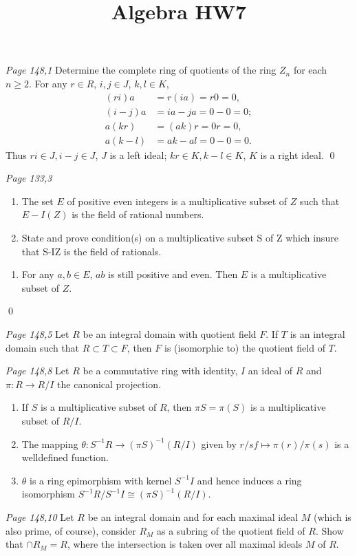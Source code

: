 

\title{Algebra HW7}
\author{\asemail}
\maketitle

\begin{enumerate}
	\isep[1em]

\prob
\textit{Page 148,1 }%
Determine the complete ring of quotients of the ring $Z_n$ for each $n\geq 2$.
\soln
For any $r \in R$, $i,j\in J$, $k,l\in K$, 
\begin{align*}
	(ri)a & =r(ia) =r0=0, \\
	(i-j)a & =ia-ja=0-0=0; \\
	a(kr) & =(ak)r =0r=0, \\
	a(k-l) & =ak-al=0-0=0. 
\end{align*}
Thus $ri \in J, i-j \in J$, $J$ is a left ideal; $kr \in K, k-l \in K$, $K$ is a right ideal.
\qed

\prob
\textit{Page 133,3}
\begin{enumerate}
	\item The set $E$ of positive even integers is a multiplicative subset of $Z$ such that $E-I(Z)$ is the field of rational numbers.
	\item State and prove condition(s) on a multiplicative subset S of Z which insure
that S-IZ is the field of rationals.
\end{enumerate}
\soln
\begin{enumerate}
	\item For any $a,b\in E$, $ab$ is still positive and even. Then $E$ is a multiplicative subset of $Z$.
\end{enumerate}
\qed

\prob
\textit{Page 148,5}
Let $R$ be an integral domain with quotient field $F$. 
If $T$ is an integral domain such that $R\subset T \subset F$, then $F$ is (isomorphic to) the quotient field of $T$.
\soln

\prob
\textit{Page 148,8}
Let $R$ be a commutative ring with identity, $I$ an ideal of $R$ and $\pi: R\to R/I$ the canonical projection.
\begin{enumerate}
	\item If $S$ is a multiplicative subset of $R$, then $\pi S = \pi(S)$ is a multiplicative subset of $R/ I$.
	\item The mapping $\theta : S^{-1} R \to (\pi S)^{-1}(R/ I)$ given by $r/ s f\mapsto \pi(r)/\pi(s)$ is a welldefined function.
	\item $\theta$ is a ring epimorphism with kernel $S^{-1}I$ and hence induces a ring isomorphism $S^{-1}R/S^{-1}I\cong (\pi S)^{-1}(R/ I)$.
\end{enumerate}
\soln

\prob\textit{Page 148,10}
Let $R$ be an integral domain and for each maximal ideal $M$ (which is also prime, of course), consider $R_M$ as a subring of the quotient field of $R$.
Show that $\cap R_M = R$, where the intersection is taken over all maximal ideals $M$ of $R$.
\soln

\end{enumerate}
